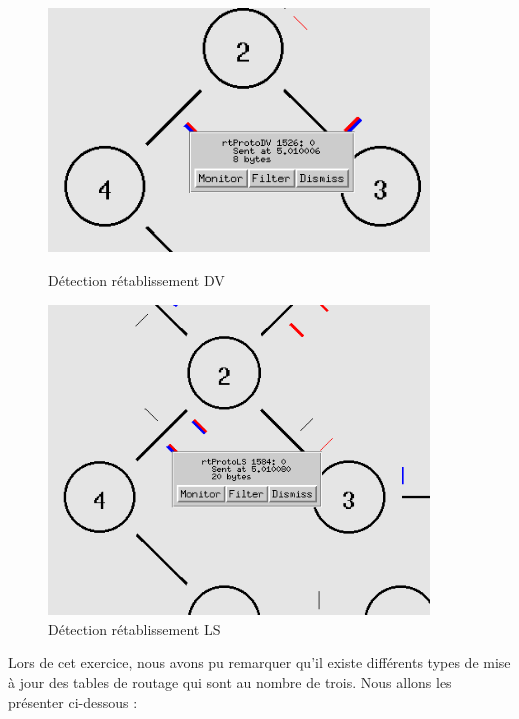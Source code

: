 \documentclass[11pt]{article}
\begin{document}
\begin{figure}[H]
    \begin{minipage}[c]{.5\linewidth}
        \centering
        \includegraphics[width=0.9\textwidth]{assets/tp2/retablissementlienDV.png}
        \caption{Détection rétablissement DV}
        \label{retDV}
    \end{minipage}
      \hfill%
    \begin{minipage}[c]{.5\linewidth}
        \centering
        \includegraphics[width=0.9\textwidth]{assets/tp2/retablissementLienLS.png}
        \caption{Détection rétablissement LS}
        \label{retLS}
    \end{minipage}
\end{figure}

Lors de cet exercice, nous avons pu remarquer qu’il existe différents types de mise à jour des tables de routage qui sont au nombre de trois. Nous allons les présenter ci-dessous :
\end{document}
